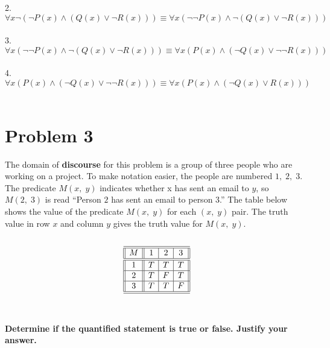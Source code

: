 \documentclass{amsart}
\theoremstyle{definition}
\theoremstyle{Exercise}
\theoremstyle{remark}
\theoremstyle{rule}
\numberwithin{equation}{section}
\begin{document}
\begin{enumerate}[label=(\alph*)]
2. $\forall x \neg (\neg P(x) \land (Q(x) \lor \neg R(x))) \equiv \forall x (\neg \neg P(x) \land \neg (Q(x) \lor \neg R(x)))$\\\\
3. $\forall x (\neg \neg P(x) \land \neg (Q(x) \lor \neg R(x))) \equiv \forall x (P(x) \land (\neg Q(x) \lor \neg \neg R(x)))$\\\\
4. $\forall x (P(x) \land (\neg Q(x) \lor \neg \neg R(x))) \equiv \forall x (P(x) \land (\neg Q(x) \lor R(x)))$
\\\\
\end{enumerate}


\newpage




\section*{Problem 3}

The domain of {\bf discourse} for this problem is a group of three people who are working on a project. To make notation easier, the people are numbered $1, \;2, \;3$. The predicate $M(x,\; y)$ indicates whether x has sent an email to $y$, so $M(2, \;3)$ is read ``Person $2$ has sent an email to person $3$.'' The table below shows the value of the predicate $M(x,\;y)$ for each $(x,\;y)$ pair. The truth value in row $x$ and column $y$ gives the truth value for $M(x,\;y)$.\\\\
\[
 \begin{array}{||c||c|c|c||}
\hline\hline
M & 1 & 2& 3\\
\hline\hline
1 &T & T & T\\
\hline
2 &T & F & T\\
\hline
3 &T & T & F\\
\hline\hline
    \end{array}
    \]\\\\
{\bf Determine if the quantified statement is true or false. Justify your answer.}\\
\end{document}
